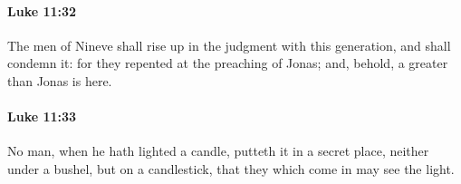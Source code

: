 		\paragraph{Luke 11:32} %
			\label{LUKE-11-32}

			The men of Nineve shall rise up in the judgment with this generation, and shall condemn it: for they repented at the preaching of Jonas; and, behold, a greater than Jonas is here.

			\begin{framed}
			\scriptsize
				\begin{compactdesc}
					\item[SBLG] 
				\end{compactdesc}
			\end{framed}

		\paragraph{Luke 11:33} %
			\label{LUKE-11-33}

			No man, when he hath lighted a candle, putteth it in a secret place, neither under a bushel, but on a candlestick, that they which come in may see the light.

